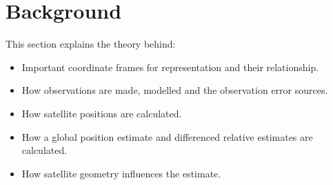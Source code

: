 \chapter{Background}
This section explains the theory behind:
\begin{itemize}
\item Important coordinate frames for representation and their relationship.
\item How observations are made, modelled and the observation error sources.
\item How satellite positions are calculated.
\item How a global position estimate and differenced relative estimates are calculated.
\item How satellite geometry influences the estimate.
\end{itemize}

